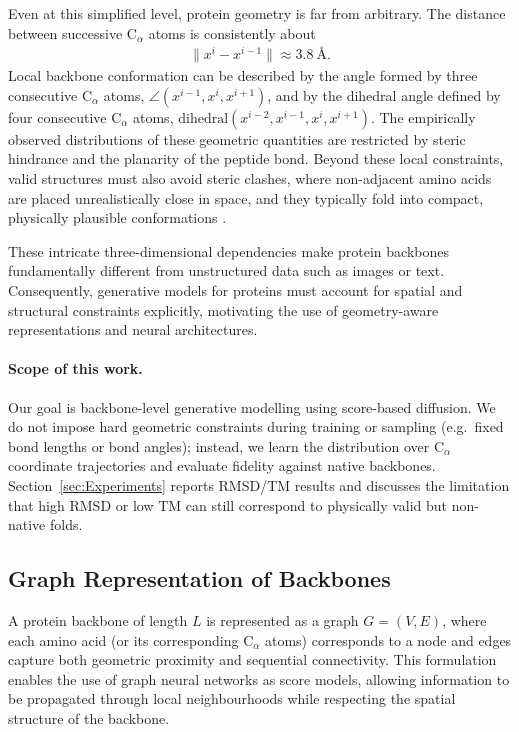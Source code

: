 \documentclass[a4paper,12pt]{article}
\begin{document}
Even at this simplified level, protein geometry is far from arbitrary. The distance between successive C\(_\alpha\) atoms is consistently about
\begin{align*}
    \|x^i - x^{i-1}\| \approx 3.8~\text{\AA}.
\end{align*}
Local backbone conformation can be described by the angle formed by three consecutive C\(_\alpha\) atoms, \(\angle(x^{i-1}, x^i, x^{i+1})\), and by the dihedral angle defined by four consecutive C\(_\alpha\) atoms, \(\mathrm{dihedral}(x^{i-2}, x^{i-1}, x^i, x^{i+1})\). The empirically observed distributions of these geometric quantities are restricted by steric hindrance and the planarity of the peptide bond. Beyond these local constraints, valid structures must also avoid steric clashes, where non-adjacent amino acids are placed unrealistically close in space, and they typically fold into compact, physically plausible conformations \citep{creighton1993proteins,branden2012IntroductionProteinStructure}.

These intricate three-dimensional dependencies make protein backbones fundamentally different from unstructured data such as images or text. 
Consequently, generative models for proteins must account for spatial and structural constraints explicitly, motivating the use of geometry-aware representations and neural architectures.

\paragraph{Scope of this work.}
Our goal is backbone-level generative modelling using score-based diffusion. 
We do not impose hard geometric constraints during training or sampling (e.g.\ fixed bond lengths or bond angles); instead, we learn the distribution over C\(_\alpha\) coordinate trajectories and evaluate fidelity against native backbones. 
Section~\ref{sec:Experiments} reports RMSD/TM results and discusses the limitation that high RMSD or low TM can still correspond to physically valid but non-native folds.

\subsection{Graph Representation of Backbones}\label{subsec:graph-repr}
A protein backbone  of length \(L\) is represented as a graph \(G=(V,E)\), where each amino acid (or its corresponding C\(_\alpha\) atoms) corresponds to a node and edges capture both geometric proximity and sequential connectivity. This formulation enables the use of graph neural networks as score models, allowing information to be propagated through local neighbourhoods while respecting the spatial structure of the backbone. 
\end{document}
